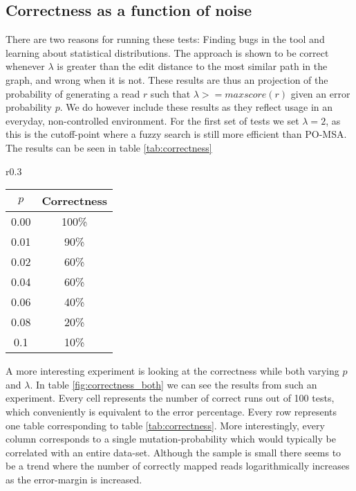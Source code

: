 \documentclass[thesis.tex]{subfiles}
\begin{document}
\subsection*{Correctness as a function of noise}
There are two reasons for running these tests: Finding bugs in the tool and learning about statistical distributions. The approach is shown to be correct whenever $\lambda$ is greater than the edit distance to the most similar path in the graph, and wrong when it is not. These results are thus an projection of the probability of generating a read $r$ such that $\lambda>=maxscore(r)$ given an error probability $p$. We do however include these results as they reflect usage in an everyday, non-controlled environment. For the first set of tests we set $\lambda=2$, as this is the cutoff-point where a fuzzy search is still more efficient than PO-MSA. The results can be seen in table \ref{tab:correctness}
\begin{wraptable}{r}{0.3\textwidth}
  \begin{tabular}{|c|c|}
    \hline $p$ & \textbf{Correctness} \\ \hline
    0.00 & 100\% \\ \hline
    0.01 & 90\% \\ \hline
    0.02 & 60\% \\ \hline
    0.04 & 60\% \\ \hline
    0.06 & 40\% \\ \hline
    0.08 & 20\% \\ \hline
    0.1 & 10\% \\ \hline
  \end{tabular}
  \caption{Percentage of correctly aligned reads as $p$ varies and $\lambda$ is fixed}
  \label{tab:correctness}
\end{wraptable}
A more interesting experiment is looking at the correctness while both varying $p$ and $\lambda$. In table \ref{fig:correctness_both} we can see the results from such an experiment. Every cell represents the number of correct runs out of 100 tests, which conveniently is equivalent to the error percentage. Every row represents one table corresponding to table \ref{tab:correctness}. More interestingly, every column corresponds to a single mutation-probability which would typically be correlated with an entire data-set. Although the sample is small there seems to be a trend where the number of correctly mapped reads logarithmically increases as the error-margin is increased.
\end{document}
